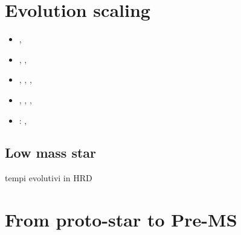 \documentclass[main.tex]{subfiles}
\begin{document}
\section{Evolution scaling}

\begin{itemize}
    \item {}, \xdiminuisce{\tau}
    \item {}, , 
    \item {}, , , \xaumenta{\tau}
    \item {}, , , \xdiminuisce{\tau}
    \item {}: , \xdiminuisce{\kappa} 
\end{itemize}

\subsection{Low mass star}

tempi evolutivi in HRD


\section{From proto-star to Pre-MS}
\end{document}
